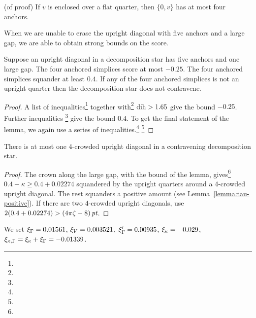 \begin{corollary} (of proof)
If $v$ is enclosed over a flat quarter, then $\{0,v\}$ has at most four
anchors.
\end{corollary}

When we are unable to erase the upright diagonal with five anchors
and a large gap, we are able to obtain strong bounds on the score.


\begin{lemma}
    \label{lemma:4-crowded}
Suppose an upright diagonal in a decomposition star has five
anchors and one large gap. The four anchored simplices score at
most $-0.25$. The four anchored simplices squander at least $0.4$.
If any of the four anchored simplices is not an upright quarter
then the decomposition star does not contravene.
\end{lemma}

\begin{proof}
A list of inequalities\footnote{} %
together with\footnote{} %
$\operatorname{dih}>1.65$ give the bound $-0.25$.
Further inequalities \footnote{} %
give the bound $0.4$.  To get the final statement of the lemma, we
again use a series of inequalities.\footnote{} %
\footnote{} %
\end{proof}

\begin{corollary}  There is at most one $4$-crowded upright
diagonal in a contravening decomposition star.
\end{corollary}

\begin{proof}  The crown along the large gap,
with the bound of the lemma, gives\footnote{} %
    $0.4-\kappa \ge 0.4+0.02274$
squandered by the upright quarters around a $4$-crowded upright
diagonal. The rest squanders a positive amount (see
Lemma~\ref{lemma:tau-positive}). If there are two $4$-crowded
upright diagonals, use $2(0.4+0.02274)>(4\pi\zeta-8)\,\hbox{\it pt}$.
\end{proof}

\begin{definition}
We set $\xi_\Gamma = 0.01561$, $\xi_V = 0.003521$, $\xi_\Gamma'=0.00935$,
$\xi_\kappa=-0.029$, $\xi_{\kappa,\Gamma} = \xi_\kappa+\xi_\Gamma = -0.01339$.
\end{definition}

